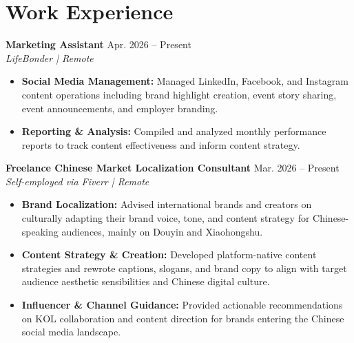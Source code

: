 \documentclass[a4paper,10pt]{article}
\begin{document}
\section*{Work Experience}

\textbf{Marketing Assistant} \hfill Apr. 2026 -- Present\\
\textit{LifeBonder | Remote}
\begin{itemize}[noitemsep]
  \item \textbf{Social Media Management:} Managed LinkedIn, Facebook, and Instagram content operations including brand highlight creation,  event story sharing, event announcements, and employer branding.
  \item \textbf{Reporting \& Analysis:} Compiled and analyzed monthly performance reports to track content effectiveness and inform content strategy.
\end{itemize}

\vspace{6pt}
\textbf{Freelance Chinese Market Localization Consultant} \hfill Mar. 2026 -- Present\\
\textit{Self-employed via Fiverr | Remote}
\begin{itemize}[noitemsep]
  \item \textbf{Brand Localization:} Advised international brands and creators on culturally adapting their brand voice, tone, and content strategy for Chinese-speaking audiences, mainly on Douyin and Xiaohongshu.
  \item \textbf{Content Strategy \& Creation:} Developed platform-native content strategies and rewrote captions, slogans, and brand copy to align with target audience aesthetic sensibilities and Chinese digital culture.
  \item \textbf{Influencer \& Channel Guidance:} Provided actionable recommendations on KOL collaboration and content direction for brands entering the Chinese social media landscape.
\end{itemize}
\end{document}
